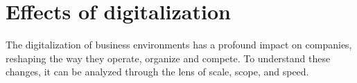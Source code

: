 \documentclass[a4]{scrartcl}
\begin{document}
	
	
	\section{Effects of digitalization}
	
	
	The digitalization of business environments has a profound impact on companies, reshaping the way they operate, organize and compete. To understand these changes, it can be analyzed through the lens of scale, scope, and speed.
	
	
	
\end{document}
